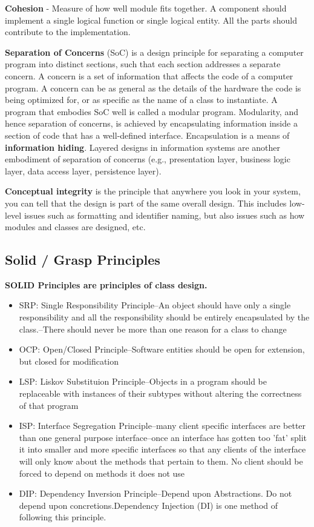 \documentclass[12pt,a4paper,titlepage]{article}
\begin{document}
\textbf{Cohesion} - Measure of how well module fits together.
A component should implement a single logical function or single logical entity. All the parts should contribute to the implementation.\par
\textbf{Separation of Concerns} (SoC) is a design principle for separating a computer program into distinct sections, such that each section addresses a separate concern. A concern is a set of information that affects the code of a computer program. A concern can be as general as the details of the hardware the code is being optimized for, or as specific as the name of a class to instantiate. A program that embodies SoC well is called a modular program. Modularity, and hence separation of concerns, is achieved by encapsulating information inside a section of code that has a well-defined interface. Encapsulation is a means of \textbf{information hiding}. Layered designs in information systems are another embodiment of separation of concerns (e.g., presentation layer, business logic layer, data access layer, persistence layer).\par
\textbf{Conceptual integrity} is the principle that anywhere you look in your system, you can tell that the design is part of the same overall design. This includes low-level issues such as formatting and identifier naming, but also issues such as how modules and classes are designed, etc.\par
\subsection{Solid / Grasp Principles}
\textbf{SOLID Principles are principles of class design.}
\begin{itemize}
	\item SRP: Single Responsibility Principle–An object should have only a single responsibility and all the responsibility should be entirely encapsulated by the class.–There should never be more than one reason for a class to change
	\item OCP: Open/Closed Principle–Software entities should be open for extension, but closed for modification
	\item LSP: Liskov Substituion Principle–Objects in a program should be replaceable with instances of their subtypes without altering the correctness of that program
	\item ISP: Interface Segregation Principle–many client specific interfaces are better than one general purpose interface–once an interface has gotten too 'fat' split it into smaller and more specific interfaces so that any clients of the interface will only know about the methods that pertain to them. No client should be forced to depend on methods it does not use
	\item DIP: Dependency Inversion Principle–Depend upon Abstractions. Do not depend upon concretions.Dependency Injection (DI) is one method of following this principle.
\end{itemize}
\end{document}
